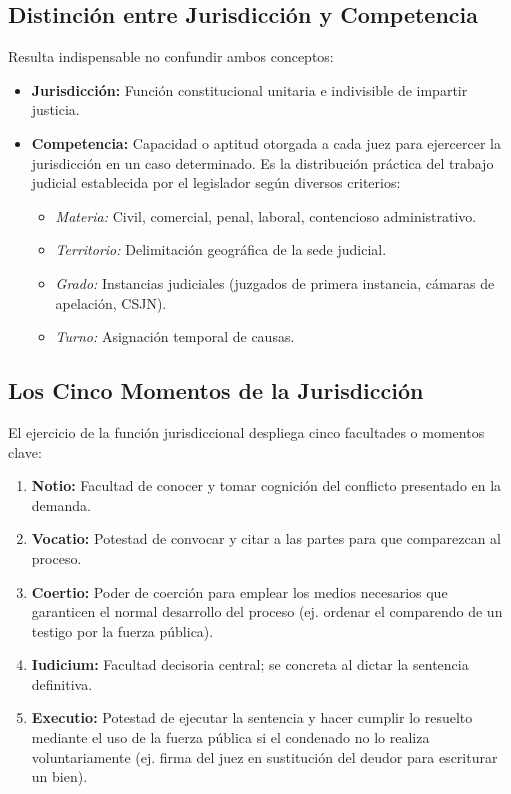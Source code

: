 \documentclass[12pt,oneside]{book}
\begin{document}
\subsection{Distinción entre Jurisdicción y Competencia}
Resulta indispensable no confundir ambos conceptos:
\begin{itemize}
    \item \textbf{Jurisdicción:} Función constitucional unitaria e indivisible de impartir justicia.
    \item \textbf{Competencia:} Capacidad o aptitud otorgada a cada juez para ejercercer la jurisdicción en un caso determinado. Es la distribución práctica del trabajo judicial establecida por el legislador según diversos criterios:
    \begin{itemize}
        \item \textit{Materia:} Civil, comercial, penal, laboral, contencioso administrativo.
        \item \textit{Territorio:} Delimitación geográfica de la sede judicial.
        \item \textit{Grado:} Instancias judiciales (juzgados de primera instancia, cámaras de apelación, CSJN).
        \item \textit{Turno:} Asignación temporal de causas.
    \end{itemize}
\end{itemize}

\subsection{Los Cinco Momentos de la Jurisdicción}
El ejercicio de la función jurisdiccional despliega cinco facultades o momentos clave:

\begin{enumerate}
    \item \textbf{Notio:} Facultad de conocer y tomar cognición del conflicto presentado en la demanda.
    \item \textbf{Vocatio:} Potestad de convocar y citar a las partes para que comparezcan al proceso.
    \item \textbf{Coertio:} Poder de coerción para emplear los medios necesarios que garanticen el normal desarrollo del proceso (ej. ordenar el comparendo de un testigo por la fuerza pública).
    \item \textbf{Iudicium:} Facultad decisoria central; se concreta al dictar la sentencia definitiva.
    \item \textbf{Executio:} Potestad de ejecutar la sentencia y hacer cumplir lo resuelto mediante el uso de la fuerza pública si el condenado no lo realiza voluntariamente (ej. firma del juez en sustitución del deudor para escriturar un bien).
\end{enumerate}
\end{document}

